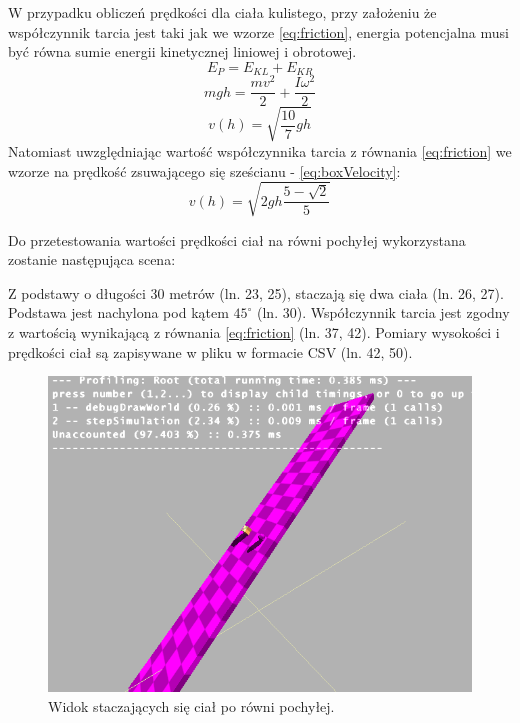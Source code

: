 W przypadku obliczeń prędkości dla ciała kulistego, przy założeniu że
współczynnik tarcia jest taki jak we wzorze \ref{eq:friction}, energia
potencjalna musi być równa sumie energii kinetycznej liniowej i obrotowej.
\begin{equation}
E_{P} = E_{KL} + E_{KR}
\end{equation}
\begin{equation}
mgh = \frac{mv^{2}}{2} + \frac{I\omega^{2}}{2}
\end{equation}
\begin{equation}
v(h) = \sqrt{\frac{10}{7}gh}
\label{eq:ballVelocity}
\end{equation}
Natomiast uwzględniając wartość współczynnika tarcia z równania
\ref{eq:friction} we wzorze na prędkość zsuwającego się sześcianu -
\ref{eq:boxVelocity}:
\begin{equation}
v(h) = \sqrt{2gh\frac{5-\sqrt{2}}{5}}
\label{eq:ballVelocity2}
\end{equation}

Do przetestowania wartości prędkości ciał na równi pochyłej wykorzystana
zostanie następująca scena:



Z podstawy o długości 30 metrów (ln. 23, 25), staczają się dwa ciała (ln. 26, 
27). Podstawa jest nachylona pod kątem $ 45^{\circ} $ (ln. 30). Współczynnik
tarcia jest zgodny z wartością wynikającą z równania \ref{eq:friction} (ln. 37,
42). Pomiary wysokości i prędkości ciał są zapisywane w pliku w formacie CSV
(ln. 42, 50).

\begin{figure}
\centering
\includegraphics[scale=0.5]{./img/rowniaScreen.PNG}
\caption{Widok staczających się ciał po równi pochyłej.}
\label{fig:rowniaScreen}
\end{figure}

